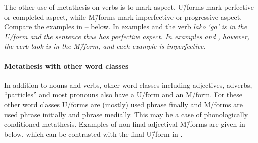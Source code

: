 The other use of metathesis on verbs is to mark aspect.
U\=/forms mark perfective or completed aspect,
while M\=/forms mark imperfective or progressive aspect.
Compare the examples in -- below.
In examples  and  the verb \it{lako} `go'
is in the U\=/form and the sentence thus has perfective aspect.
In examples  and , however,
the verb \it{laok} is in the M\=/form,
and each example is imperfective.

\begin{exe}\let\eachwordone=\itshape
	\label{ex:HelAsp1a}
	\label{ex:HelAsp2a}
	\label{ex:HelAsp1b} %
	\label{ex:HelAsp2b} %
\end{exe}

\paragraph{Metathesis with other word classes}\label{sec:MetOthWorCla}
In addition to nouns and verbs, other word classes including
adjectives, adverbs, ``particles'' and most pronouns also have a U\=/form and an M\=/form.
For these other word classes U\=/forms are (mostly) used phrase finally
and M\=/forms are used phrase initially and phrase medially.
This may be a case of phonologically conditioned metathesis.
Examples of non-final adjectival M\=/forms are
given in -- below,
which can be contrasted with the final U\=/form in .


